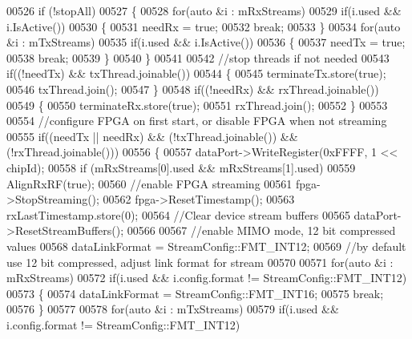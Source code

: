\begin{DoxyCode}
00526     \textcolor{keywordflow}{if} (!stopAll)
00527     \{
00528         \textcolor{keywordflow}{for}(\textcolor{keyword}{auto} &i : mRxStreams)
00529             \textcolor{keywordflow}{if}(i.used && i.IsActive())
00530             \{
00531                 needRx = \textcolor{keyword}{true};
00532                 \textcolor{keywordflow}{break};
00533             \}
00534         \textcolor{keywordflow}{for}(\textcolor{keyword}{auto} &i : mTxStreams)
00535             \textcolor{keywordflow}{if}(i.used && i.IsActive())
00536             \{
00537                 needTx = \textcolor{keyword}{true};
00538                 \textcolor{keywordflow}{break};
00539             \}
00540     \}
00541 
00542     \textcolor{comment}{//stop threads if not needed}
00543     \textcolor{keywordflow}{if}((!needTx) && txThread.joinable())
00544     \{
00545         terminateTx.store(\textcolor{keyword}{true});
00546         txThread.join();
00547     \}
00548     \textcolor{keywordflow}{if}((!needRx) && rxThread.joinable())
00549     \{
00550         terminateRx.store(\textcolor{keyword}{true});
00551         rxThread.join();
00552     \}
00553 
00554     \textcolor{comment}{//configure FPGA on first start, or disable FPGA when not streaming}
00555     \textcolor{keywordflow}{if}((needTx || needRx) && (!txThread.joinable()) && (!rxThread.joinable()))
00556     \{
00557         dataPort->WriteRegister(0xFFFF, 1 << chipId);
00558         \textcolor{keywordflow}{if} (mRxStreams[0].used && mRxStreams[1].used)
00559             AlignRxRF(\textcolor{keyword}{true});
00560         \textcolor{comment}{//enable FPGA streaming}
00561         fpga->StopStreaming();
00562         fpga->ResetTimestamp();
00563         rxLastTimestamp.store(0);
00564         \textcolor{comment}{//Clear device stream buffers}
00565         dataPort->ResetStreamBuffers();
00566 
00567         \textcolor{comment}{//enable MIMO mode, 12 bit compressed values}
00568         dataLinkFormat = StreamConfig::FMT_INT12;
00569         \textcolor{comment}{//by default use 12 bit compressed, adjust link format for stream}
00570 
00571         \textcolor{keywordflow}{for}(\textcolor{keyword}{auto} &i : mRxStreams)
00572             \textcolor{keywordflow}{if}(i.used && i.config.format != StreamConfig::FMT_INT12)
00573             \{
00574                 dataLinkFormat = StreamConfig::FMT_INT16;
00575                 \textcolor{keywordflow}{break};
00576             \}
00577 
00578         \textcolor{keywordflow}{for}(\textcolor{keyword}{auto} &i : mTxStreams)
00579             \textcolor{keywordflow}{if}(i.used && i.config.format != StreamConfig::FMT_INT12)

\end{DoxyCode}
